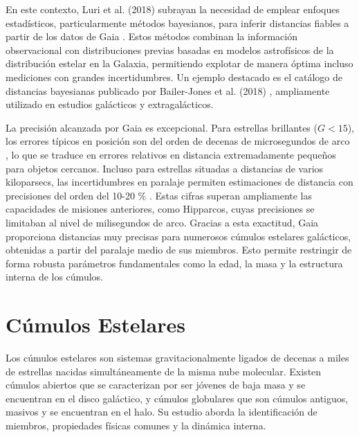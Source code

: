     En este contexto, Luri et al. (2018) subrayan la necesidad de emplear 
    enfoques estadísticos, particularmente métodos bayesianos, para inferir 
    distancias fiables a partir de los datos de Gaia \cite{Luri2018}. Estos 
    métodos combinan la información observacional con distribuciones previas 
    basadas en modelos astrofísicos de la distribución estelar en la Galaxia, 
    permitiendo explotar de manera óptima incluso mediciones con grandes 
    incertidumbres. Un ejemplo destacado es el catálogo de distancias bayesianas 
    publicado por Bailer-Jones et al. (2018) \cite{bailer2018estimating}, 
    ampliamente utilizado en estudios galácticos y extragalácticos.

    La precisión alcanzada por Gaia es excepcional. Para estrellas brillantes 
    ($G < 15$), los errores típicos en posición son del orden de decenas de 
    microsegundos de arco \newline \cite{ESA2013facts}, lo que se traduce en 
    errores relativos en distancia extremadamente pequeños para objetos 
    cercanos. Incluso para estrellas situadas a distancias de varios 
    kiloparsecs, las incertidumbres en paralaje permiten estimaciones de 
    distancia con precisiones del orden del 10-20 \% \cite{ESA2013facts}. Estas 
    cifras superan ampliamente las capacidades de misiones anteriores, como 
    Hipparcos, cuyas precisiones se limitaban al nivel de milisegundos de arco. 
    Gracias a esta exactitud, Gaia proporciona distancias muy precisas para 
    numerosos cúmulos estelares galácticos, obtenidas a partir del paralaje 
    medio de sus miembros. Esto permite restringir de forma robusta parámetros 
    fundamentales como la edad, la masa y la estructura interna de los cúmulos.

\section{Cúmulos Estelares}
    Los cúmulos estelares son sistemas gravitacionalmente ligados de decenas a 
    miles de estrellas nacidas simultáneamente de la misma nube molecular. 
    Existen cúmulos abiertos que se caracterizan por ser jóvenes de baja masa y 
    se encuentran en el disco galáctico, y cúmulos globulares que son cúmulos 
    antiguos, masivos y se encuentran en el halo. Su estudio aborda la 
    identificación de miembros, propiedades físicas comunes y la dinámica 
    interna. 

